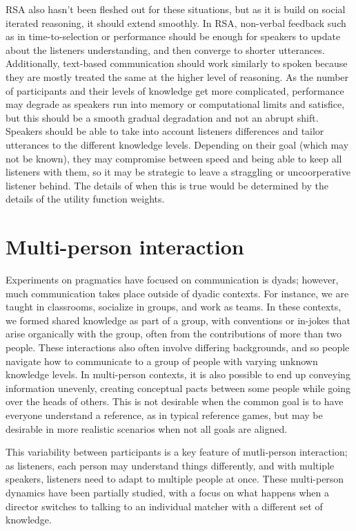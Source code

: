 \documentclass[11pt]{article}
\begin{document}
RSA also hasn't been fleshed out for these situations, but as it is build on social iterated reasoning, it should extend smoothly. In RSA, non-verbal feedback such as in time-to-selection or performance should be enough for speakers to update about the listeners understanding, and then converge to shorter utterances. Additionally, text-based communication should work similarly to spoken because they are mostly treated the same at the higher level of reasoning. As the number of participants and their levels of knowledge get more complicated, performance may degrade as speakers run into memory or computational limits and satisfice, but this should be a smooth gradual degradation and not an abrupt shift. Speakers should be able to take into account listeners differences and tailor utterances to the different knowledge levels. Depending on their goal (which may not be known), they may compromise between speed and being able to keep all listeners with them, so it may be strategic to leave a straggling or uncoorperative listener behind. The details of when this is true would be determined by the details of the utility function weights. 


	\section{Multi-person interaction}
	Experiments on pragmatics have focused on communication is dyads; however, much communication takes place outside of dyadic contexts. For instance, we are taught in classrooms, socialize in groups, and work as teams. In these contexts, we formed shared knowledge as part of a group, with conventions or in-jokes that arise organically with the group, often from the contributions of more than two people. These interactions also often involve differing backgrounds, and so people navigate how to communicate to a group of people with varying unknown knowledge levels. In multi-person contexts, it is also possible to end up conveying information unevenly, creating conceptual pacts between some people while going over the heads of others. This is not desirable when the common goal is to have everyone understand a reference, as in typical reference games, but may be desirable in more realistic scenarios when not all goals are aligned.
	
	This variability between participants is a key feature of mutli-person interaction; as listeners, each person may understand things differently, and with multiple speakers, listeners need to adapt to multiple people at once. These multi-person dynamics have been partially studied, with a focus on what happens when a director switches to talking to an individual matcher with a different set of knowledge. 
	
\end{document}
